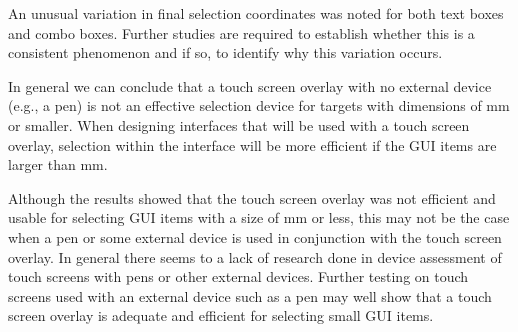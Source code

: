 \documentclass{elsart}
\begin{document}
An unusual variation in final selection coordinates was noted for both
text boxes and combo boxes. Further studies are required to establish
whether this is a consistent phenomenon and if so, to identify why this
variation occurs.

In general we can conclude that a touch screen overlay with no external
device (e.g., a pen) is not an effective selection device for targets
with dimensions of \unit[4]{mm} or smaller. When designing interfaces
that will be used with a touch screen overlay, selection within the
interface will be more efficient if the GUI items are larger than
\unit[4]{mm}.

Although the results showed that the touch screen overlay was not
efficient and usable for selecting GUI items with a size of \unit[4]{mm}
or less, this may not be the case when a pen or some external device is
used in conjunction with the touch screen overlay. In general there
seems to a lack of research done in device assessment of touch screens
with pens or other external devices. Further testing on touch screens
used with an external device such as a pen may well show that a touch
screen overlay is adequate and efficient for selecting small GUI items.









% 
\end{document}
